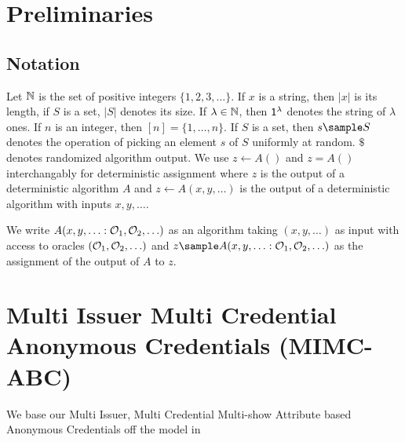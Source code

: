 \section{Preliminaries}\label{sec:preliminaries}
\subsection{Notation}
Let $\mathbb{N}$ is the set of positive integers $\{1,2,3,\ldots\}$. If $x$ is a string, then $|x|$ is its length, if $S$ is a set, $|S|$ denotes its size. If $\lambda \in \mathbb{N}$, then $\mathsf{1^{\lambda}}$ denotes the string of $\lambda$ ones. If $n$ is an integer, then $[n] = \{1, \ldots,n\}.$ If $S$ is a set, then $s \sample S$ denotes the operation of picking an element $s$ of $S$ uniformly at random. $\$$ denotes randomized algorithm output. We use $z \gets A()$ and $z = A()$ interchangably for deterministic assignment where $z$ is the output of a deterministic algorithm $A$ and $z \gets A(x,y,\ldots)$ is the output of a deterministic algorithm with inputs $x,y,\ldots$. 

We write $A(x,y,\ldots : \mathcal{O}_1, \mathcal{O}_2, \ldots)$ as an algorithm taking $(x,y,\ldots)$ as input with access to oracles $(\mathcal{O}_1, \mathcal{O}_2, \ldots)$ and $z \sample A(x,y,\ldots : \oracle_1, \oracle_2, \ldots)$ as the assignment of the output of $A$ to $z$.




\cleardoublepage
\section{Multi Issuer Multi Credential Anonymous Credentials (MIMC-ABC)}\label{sec:mimc}

We base our Multi Issuer, Multi Credential Multi-show Attribute based Anonymous Credentials off the model in \cite{fuchsbauer_structure-preserving_2019}


